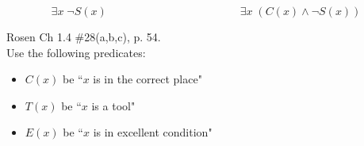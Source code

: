 \documentclass[12pt,addpoints]{exam}
\newcommand{\ra}{\rightarrow}
\begin{document}
\begin{questions}
\begin{solution}
\begin{itemize}
        $$ \exists x\; \neg S(x) \hspace{2in} \exists x\; (C(x) \wedge \neg S(x))$$
    \end{itemize}
    \end{solution}

\question[6] Rosen Ch 1.4 \#28(a,b,c), p. 54.\\
Use the following predicates:
\begin{itemize}
    \item $C(x)$ be ``$x$ is in the correct place"
    \item $T(x)$ be ``$x$ is a tool"
    \item $E(x)$ be ``$x$ is in excellent condition"
\end{itemize}

\end{questions}
\end{document}
